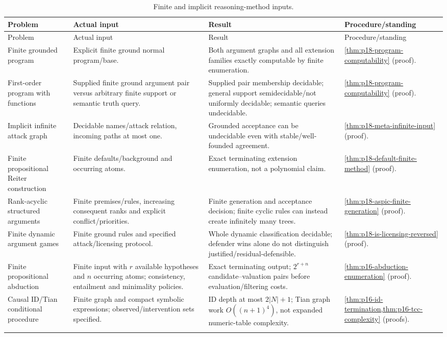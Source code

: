 \begin{landscape}
\begingroup\small\setlength{\tabcolsep}{3pt}
\begin{longtable}{@{}p{.18\linewidth}p{.25\linewidth}p{.23\linewidth}p{.26\linewidth}@{}}
\caption{Finite and implicit reasoning-method inputs.}\label{tab:p14-dc-arguments}\\
\toprule
Problem & Actual input & Result & Procedure/standing\\\midrule
\endfirsthead
\toprule
Problem & Actual input & Result & Procedure/standing\\\midrule
\endhead
\bottomrule\endfoot
Finite grounded program & Explicit finite ground normal program/base. & Both argument graphs and all extension families exactly computable by finite enumeration. & \cref{thm:p18-program-computability} (proof).\\\addlinespace
First-order program with functions & Supplied finite ground argument pair versus arbitrary finite support or semantic truth query. & Supplied pair membership decidable; general support semidecidable/not uniformly decidable; semantic queries undecidable. & \cref{thm:p18-program-computability} (proof).\\\addlinespace
Implicit infinite attack graph & Decidable names/attack relation, incoming paths at most one. & Grounded acceptance can be undecidable even with stable/well-founded agreement. & \cref{thm:p18-meta-infinite-input} (proof).\\\addlinespace
Finite propositional Reiter construction & Finite defaults/background and occurring atoms. & Exact terminating extension enumeration, not a polynomial claim. & \cref{thm:p18-default-finite-method} (proof).\\\addlinespace
Rank-acyclic structured arguments & Finite premises/rules, increasing consequent ranks and explicit conflict/priorities. & Finite generation and acceptance decision; finite cyclic rules can instead create infinitely many trees. & \cref{thm:p18-aspic-finite-generation} (proof).\\\addlinespace
Finite dynamic argument games & Finite ground rules and specified attack/licensing protocol. & Whole dynamic classification decidable; defender wins alone do not distinguish justified/residual-defensible. & \cref{thm:p18-is-licensing-reversed} (proof).\\\addlinespace
Finite propositional abduction & Finite input with \(r\) available hypotheses and \(n\) occurring atoms; consistency, entailment and minimality policies. & Exact terminating output; \(2^{r+n}\) candidate--valuation pairs before evaluation/filtering costs. & \cref{thm:p16-abduction-enumeration} (proof).\\\addlinespace
Causal ID/Tian conditional procedure & Finite graph and compact symbolic expressions; observed/intervention sets specified. & ID depth at most \(2|N|+1\); Tian graph work \(O((n+1)^4)\), not expanded numeric-table complexity. & \cref{thm:p16-id-termination,thm:p16-tcc-complexity} (proofs).\\\addlinespace
\end{longtable}
\endgroup
\end{landscape}

